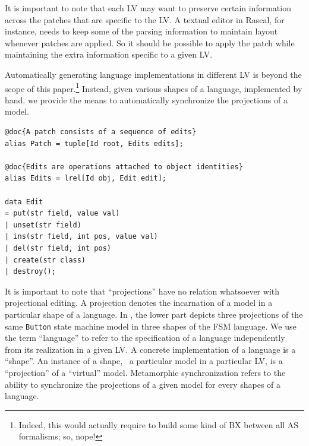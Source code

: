 It is important to note that each LV may want to preserve certain information across the patches that are specific to the LV.
A textual editor in Rascal, for instance, needs to keep some of the parsing information to maintain layout whenever patches are applied.
So it should be possible to apply the patch while maintaining the extra information specific to a given LV.

Automatically generating language implementations in different LV is beyond the scope of this paper.\footnote{Indeed, this would actually require to build some kind of BX between all AS formalisms; so, nope!} Instead, given various shapes of a language, implemented by hand, we provide the means to automatically synchronize the projections of a model.

\begin{lstlisting}[label=lst:delta-adt, caption={CRUD-like \ds structure definition in Rascal}, language=Rascal]
@doc{A patch consists of a sequence of edits}
alias Patch = tuple[Id root, Edits edits];

@doc{Edits are operations attached to object identities}
alias Edits = lrel[Id obj, Edit edit];

data Edit
= put(str field, value val)
| unset(str field)
| ins(str field, int pos, value val)
| del(str field, int pos)
| create(str class) 
| destroy();
\end{lstlisting}

It is important to note that ``projections'' have no relation whatsoever with projectional editing.
A projection denotes the incarnation of a model in a particular shape of a language.
In , the lower part depicts three projections of the same \texttt{Button} state machine model in three shapes of the FSM language.
We use the term ``language'' to refer to the specification of a language independently from its realization in a given LV.
A concrete implementation of a language is a ``shape''.
An instance of a shape, \ie~a particular model in a particular LV, is a ``projection'' of a ``virtual'' model.
Metamorphic synchronization refers to the ability to synchronize the projections of a given model for every shapes of a language.
